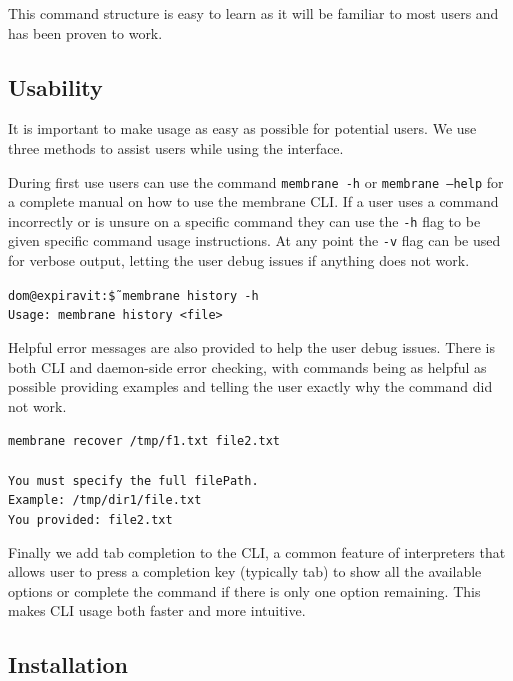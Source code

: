 \documentclass[11pt, a4paper, twocolumn, twoside]{report}
\def\code#1{\texttt{#1}}
\begin{document}
This command structure is easy to learn as it will be familiar to most users and has been proven to work.

\subsection{Usability}

It is important to make usage as easy as possible for potential users. We use three methods to assist users while using the interface.

During first use users can use the command \code{membrane -h} or \code{membrane --help} for a complete manual on how to use the membrane CLI. If a user uses a command incorrectly or is unsure on a specific command they can use the \code{-h} flag to be given specific command usage instructions. At any point the \code{-v} flag can be used for verbose output, letting the user debug issues if anything does not work.

\begin{displayquote}
 \scriptsize
 \code{dom@expiravit:\~\$ membrane history -h} \\
 \code{Usage: membrane history <file>}
\end{displayquote}

Helpful error messages are also provided to help the user debug issues. There is both CLI and daemon-side error checking, with commands being as helpful as possible providing examples and telling the user exactly why the command did not work.

\begin{displayquote}
 \scriptsize
 \code{membrane recover /tmp/f1.txt file2.txt} \\ \\
 \code{You must specify the full filePath.} \\
 \code{Example: /tmp/dir1/file.txt} \\
 \code{You provided: file2.txt}
\end{displayquote}

Finally we add tab completion to the CLI, a common feature of interpreters that allows user to press a completion key (typically tab) to show all the available options or complete the command if there is only one option remaining. This makes CLI usage both faster and more intuitive.

\subsection{Installation}
\end{document}
